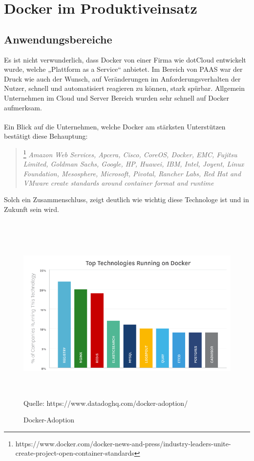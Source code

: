 \documentclass[12pt,toc=bib,toc=listof]{scrreprt}
\begin{document}

\chapter{Docker im Produktiveinsatz}
\section{Anwendungsbereiche}

Es ist nicht verwunderlich, dass Docker von einer Firma wie dotCloud entwickelt wurde, welche „Plattform as a Service“ anbietet.
Im Bereich von PAAS war der Druck wie auch der Wunsch, auf Veränderungen im Anforderungsverhalten der Nutzer, schnell und automatisiert reagieren zu können, stark spürbar. 
Allgemein Unternehmen im Cloud und Server Bereich wurden sehr schnell auf Docker aufmerksam. \\
\\
Ein Blick auf die Unternehmen, welche Docker am stärksten Unterstützen bestätigt diese Behauptung:
\begin{quote}
	\footnote[1]{https://www.docker.com/docker-news-and-press/industry-leaders-unite-create-project-open-container-standards}
	\textit{Amazon Web Services, Apcera, Cisco, CoreOS, Docker, EMC, Fujitsu Limited, Goldman Sachs, Google, HP, Huawei, IBM, Intel, Joyent, Linux Foundation, Mesosphere, Microsoft, Pivotal, Rancher Labs, Red Hat and VMware create standards around container format and runtime}
\end{quote}
Solch ein Zusammenschluss, zeigt deutlich wie wichtig diese Technologe ist und  in Zukunft sein wird.\\
\\
\begin{figure}
	\centering
	\caption{Docker-Adoption}
	\includegraphics[width=15cm, height=9cm, scale=0.3]{docker-adoption.png}
	Quelle: https://www.datadoghq.com/docker-adoption/
\end{figure}
\end{document}
